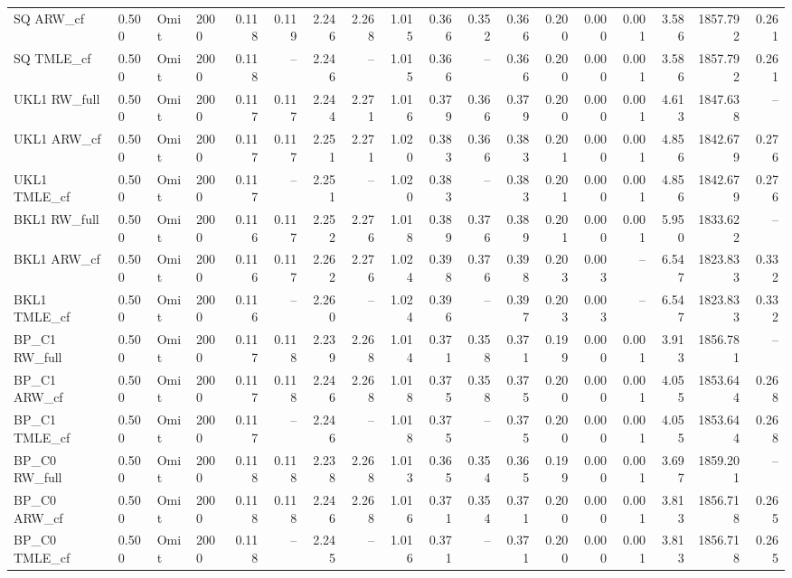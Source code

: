 \begin{tabular}{llllrrrrrrrrrrrrrr}
SQ ARW\_cf & 0.500 & Omit & 2000 & 0.118 & 0.119 & 2.246 & 2.268 & 1.015 & 0.366 & 0.352 & 0.366 & 0.200 & 0.000 & 0.001 & 3.586 & 1857.792 & 0.261 \\
SQ TMLE\_cf & 0.500 & Omit & 2000 & 0.118 & -- & 2.246 & -- & 1.015 & 0.366 & -- & 0.366 & 0.200 & 0.000 & 0.001 & 3.586 & 1857.792 & 0.261 \\
UKL1 RW\_full & 0.500 & Omit & 2000 & 0.117 & 0.117 & 2.244 & 2.271 & 1.016 & 0.379 & 0.366 & 0.379 & 0.200 & 0.000 & 0.001 & 4.613 & 1847.638 & -- \\
UKL1 ARW\_cf & 0.500 & Omit & 2000 & 0.117 & 0.117 & 2.251 & 2.271 & 1.020 & 0.383 & 0.366 & 0.383 & 0.201 & 0.000 & 0.001 & 4.856 & 1842.679 & 0.276 \\
UKL1 TMLE\_cf & 0.500 & Omit & 2000 & 0.117 & -- & 2.251 & -- & 1.020 & 0.383 & -- & 0.383 & 0.201 & 0.000 & 0.001 & 4.856 & 1842.679 & 0.276 \\
BKL1 RW\_full & 0.500 & Omit & 2000 & 0.116 & 0.117 & 2.252 & 2.276 & 1.018 & 0.389 & 0.376 & 0.389 & 0.201 & 0.000 & 0.001 & 5.950 & 1833.622 & -- \\
BKL1 ARW\_cf & 0.500 & Omit & 2000 & 0.116 & 0.117 & 2.262 & 2.276 & 1.024 & 0.398 & 0.376 & 0.398 & 0.203 & 0.003 & -- & 6.547 & 1823.833 & 0.332 \\
BKL1 TMLE\_cf & 0.500 & Omit & 2000 & 0.116 & -- & 2.260 & -- & 1.024 & 0.396 & -- & 0.397 & 0.203 & 0.003 & -- & 6.547 & 1823.833 & 0.332 \\
BP\_C1 RW\_full & 0.500 & Omit & 2000 & 0.117 & 0.118 & 2.239 & 2.268 & 1.014 & 0.371 & 0.358 & 0.371 & 0.199 & 0.000 & 0.001 & 3.913 & 1856.781 & -- \\
BP\_C1 ARW\_cf & 0.500 & Omit & 2000 & 0.117 & 0.118 & 2.246 & 2.268 & 1.018 & 0.375 & 0.358 & 0.375 & 0.200 & 0.000 & 0.001 & 4.055 & 1853.644 & 0.268 \\
BP\_C1 TMLE\_cf & 0.500 & Omit & 2000 & 0.117 & -- & 2.246 & -- & 1.018 & 0.375 & -- & 0.375 & 0.200 & 0.000 & 0.001 & 4.055 & 1853.644 & 0.268 \\
BP\_C0 RW\_full & 0.500 & Omit & 2000 & 0.118 & 0.118 & 2.238 & 2.268 & 1.013 & 0.365 & 0.354 & 0.365 & 0.199 & 0.000 & 0.001 & 3.697 & 1859.201 & -- \\
BP\_C0 ARW\_cf & 0.500 & Omit & 2000 & 0.118 & 0.118 & 2.246 & 2.268 & 1.016 & 0.371 & 0.354 & 0.371 & 0.200 & 0.000 & 0.001 & 3.813 & 1856.718 & 0.265 \\
BP\_C0 TMLE\_cf & 0.500 & Omit & 2000 & 0.118 & -- & 2.245 & -- & 1.016 & 0.371 & -- & 0.371 & 0.200 & 0.000 & 0.001 & 3.813 & 1856.718 & 0.265 \\

\end{tabular}
